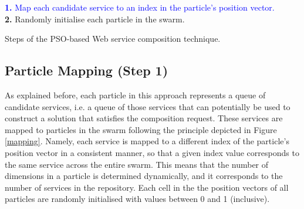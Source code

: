 \documentclass{llncs}
\begin{document}
\begin{algorithm}[!htb]
 \setlength{}
 \let\oldnl\nl%
\newcommand{\nonl}{\renewcommand{\nl}{\let\nl\oldnl}}
 \LinesNumbered
 	\textcolor{blue}{\textbf{1.} Map each candidate service to an index in the particle's position vector.}\\
	\textbf{2.} Randomly initialise each particle in the swarm.\\
	\nonl {}
	
 \caption{Steps of the PSO-based Web service composition technique.}
\label{novelSteps}
\end{algorithm}

\subsection{Particle Mapping (Step 1)}

As explained before, each particle in this approach represents a queue of candidate services, i.e. a queue of those services that can potentially be used to construct a solution that satisfies the composition request. These services are mapped to particles in the swarm following the principle depicted in Figure \ref{mapping}. Namely, each service is mapped to a different index of the particle's position vector in a consistent manner, so that a given index value corresponds to the same service across the entire swarm. This means that the number of dimensions in a particle is determined dynamically, and it corresponds to the number of services in the repository. Each cell in the the position vectors of all particles are randomly initialised with values between 0 and 1 (inclusive).
\end{document}
